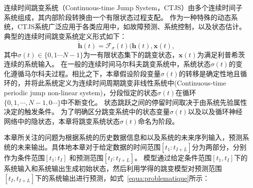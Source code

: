 连续时间跳变系统（Continuous-time Jump System，CTJS）由多个连续时间子系统组成，其内部阶段转换由一个有限状态过程支配\cite{8709809}。
作为一种特殊的动态系统，CTJS系统广泛应用于各类应用中，如故障预测\cite{9165930}、系统控制\cite{pmlr-v120-jansch-porto20a}，以及状态估计\cite{8709809}。
典型的连续时间跳变系统定义形式如下：
\begin{equation}
    \dot{\boldsymbol h}(t)=\mathcal{F}_\sigma(t)(\boldsymbol h(t), \boldsymbol x(t),
    \label{equ:ctjls}
\end{equation}
其中$\sigma(t)\in\{0,1\cdots N-1\}$为一有限状态集下的跳变状态，$\boldsymbol{x}(t)$为满足利普希茨连续的系统输入。
在一般的连续时间马尔科夫跳变系统中，系统状态$\sigma(t)$的变化遵循马尔科夫过程。相比之下，本章假设阶段变量$\sigma(t)$的转移是确定性地且循环的，并将此系统定义为连续时间周期跳变非线性系统中(Continuous-time periodic jump non-linear system)，分段恒定的状态$\sigma(t)$在循环$\{0,1,\cdots,N-1,0 \cdots\}$中不断变化。
状态跳跃之间的停留时间取决于由系统先验属性决定的触发条件。
为了明确区分跳变系统中的状态变量$\sigma(t)$以及以及循环神经网络中的隐状态，本章将跳变系统状态$\sigma(t)$命名为阶段。

本章所关注的问题为根据系统的历史数据信息和以及系统的未来序列输入，预测系统的未来输出。具体地本章对于给定数据的时间范围$[t_1:t_{I+L}]$分为两部分，分别作为条件范围$[t_1:t_{I}]$ 和预测范围$[t_{I}:t_{I+L}]$。
模型通过给定条件范围$[t_1, t_I]$下的系统输入和系统输出生成初始状态，然后利用学得的跳变模型对预测范围$[t_{I}, t_{I+L}]$下的系统输出进行预测，如式~\ref{equa:problematique}所示：

